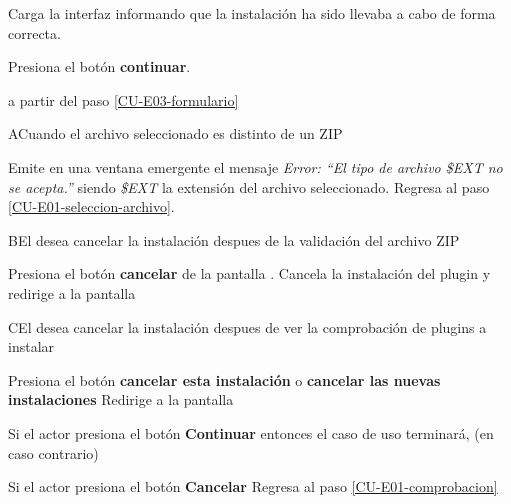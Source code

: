 \begin{UCtrayectoria}
    \Sistema Carga la interfaz  informando que la instalación
             ha sido llevaba a cabo de forma correcta. 

    \Actor Presiona el botón {\bf continuar}.

     a partir del paso \ref{CU-E03-formulario}
\end{UCtrayectoria}

\begin{UCtrayectoriaA}{A}{Cuando el archivo seleccionado es distinto de un ZIP}

  \Sistema Emite en una ventana emergente el mensaje {\it Error: ``El tipo de
           archivo \$EXT no se acepta.''} siendo {\it\$EXT} la extensión del
           archivo seleccionado.
  \Sistema Regresa al paso \ref{CU-E01-seleccion-archivo}.

\end{UCtrayectoriaA}

\begin{UCtrayectoriaA}%
{B}{El  desea cancelar la instalación despues de la validación del archivo ZIP}

    \Actor Presiona el botón {\bf cancelar} de la pantalla .
    \Sistema Cancela la instalación del plugin y redirige a la pantalla 

\end{UCtrayectoriaA}

\begin{UCtrayectoriaA}%
{C}{El  desea cancelar la instalación despues de ver la comprobación de plugins a instalar}

    \Actor Presiona el botón {\bf cancelar esta instalación} o {\bf cancelar las nuevas instalaciones}
    \Sistema Redirige a la pantalla 

    \Actor Si el actor presiona el botón {\bf Continuar} entonces 
    \UCpaso[--] el caso de uso terminará, (en caso contrario)

    \Actor Si el actor presiona el botón {\bf Cancelar}
    \Sistema Regresa al paso \ref{CU-E01-comprobacion}
\end{UCtrayectoriaA}



%
%

